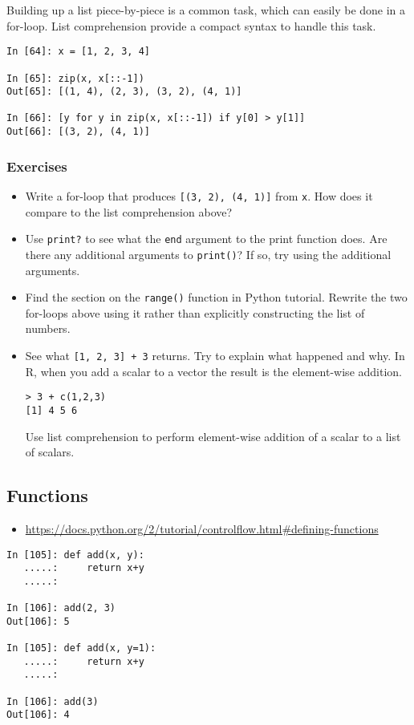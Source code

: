 Building up a list piece-by-piece is a common task, which can easily be
done in a for-loop.  List comprehension provide a compact syntax to
handle this task.

\begin{verbatim}
In [64]: x = [1, 2, 3, 4]

In [65]: zip(x, x[::-1])
Out[65]: [(1, 4), (2, 3), (3, 2), (4, 1)]

In [66]: [y for y in zip(x, x[::-1]) if y[0] > y[1]]
Out[66]: [(3, 2), (4, 1)]
\end{verbatim}
\subsubsection{Exercises}
\begin{itemize}
\item Write a for-loop that produces \texttt{[(3, 2), (4, 1)]} from \texttt{x}.
  How does it compare to the list comprehension above?
\item Use \texttt{print?} to see what the \texttt{end} argument to the print
  function does.  Are there any additional arguments to \texttt{print()}?
  If so, try using the additional arguments.
\item Find the section on the \texttt{range()} function in Python tutorial.
  Rewrite the two for-loops above using it rather than explicitly constructing
  the list of numbers.
\item See what \texttt{[1, 2, 3] + 3} returns. Try to explain what happened
and why.  In R, when you add a scalar to a vector the result is the
element-wise addition.
\begin{verbatim}
> 3 + c(1,2,3)
[1] 4 5 6
\end{verbatim}
Use list comprehension to perform element-wise addition of a scalar to a list
of scalars.
\end{itemize}

\subsection{Functions}
\begin{itemize}
\item \url{https://docs.python.org/2/tutorial/controlflow.html#defining-functions}
\end{itemize}

\begin{verbatim}
In [105]: def add(x, y):
   .....:     return x+y
   .....: 

In [106]: add(2, 3)
Out[106]: 5

In [105]: def add(x, y=1):
   .....:     return x+y
   .....:

In [106]: add(3)
Out[106]: 4
\end{verbatim}

